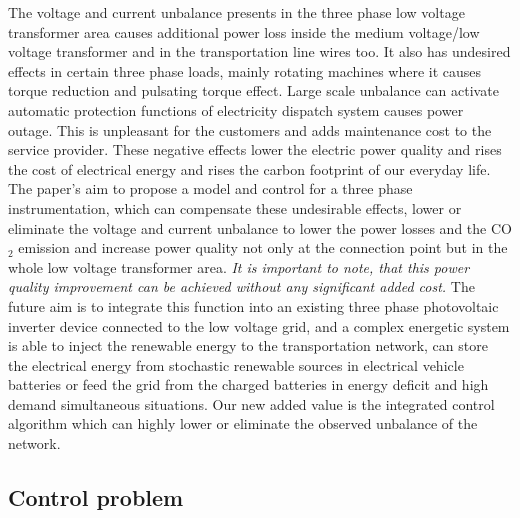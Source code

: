     The voltage and current unbalance presents in the three phase low voltage transformer area causes additional power loss inside the medium voltage/low voltage transformer and in the transportation line wires too. It also has undesired effects in certain three phase loads, mainly rotating machines where it causes torque reduction and pulsating torque effect. Large scale unbalance can activate automatic protection functions of electricity dispatch system causes power outage. This is unpleasant for the customers and adds maintenance cost to the service provider. These negative effects lower the electric power quality and rises the cost of electrical energy and rises the carbon footprint of our everyday life. The paper's aim to propose a model and control for a three phase instrumentation, which can compensate these undesirable effects, lower or eliminate the voltage and current unbalance to lower the power losses and the CO${}_2$ emission and increase power quality not only at the connection point but in the whole low voltage transformer area. \emph{It is important to note, that this power quality improvement can be achieved without any significant added cost.} The future aim is to integrate this function into an existing three phase photovoltaic inverter device connected to the low voltage grid, and a  complex energetic system is able to inject the renewable energy to the transportation network, can store the electrical energy from stochastic renewable sources in electrical vehicle batteries or feed the grid from the charged batteries in energy deficit and high demand simultaneous situations. Our new added value is the integrated control algorithm which can highly lower or eliminate the observed unbalance of the network.

    \subsection{Control problem}\label{VUB:sec:Control}

